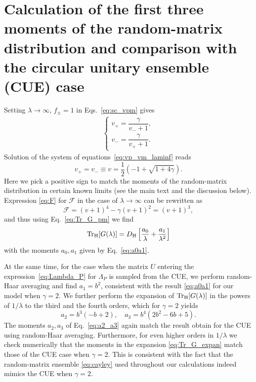 \documentclass[%
 reprint,
 superscriptaddress,
 amsmath,amssymb,
prx,
]{revtex4-2}\href{\href{}{}}{}
\begin{document}
\section{\label{sec:App_Eq_61} Calculation of the first three moments of the random-matrix distribution and comparison with the circular unitary ensemble (CUE) case}


Setting $\lambda\to\infty$, $f_{\pm}=1$ in Eqs.~\eqref{eq:sc_vpm} gives
\begin{align}
	\begin{cases}
		v_+=\dfrac{\gamma}{v_-+1}, \\
		v_-=\dfrac{\gamma}{v_++1}.
	\end{cases}
 \label{eq:vp_vm_laminf}
\end{align}
Solution of the system of equations~\eqref{eq:vp_vm_laminf} reads
\begin{equation}
	v_+=v_-\equiv v=\frac{1}{2}\left(-1+\sqrt{1+4\gamma}\right).
	\label{eq:v_pm_sol_lam0}
\end{equation}
Here we pick a positive sign to match the moments of the random-matrix distribution in certain known limits (see the main text and the discussion below).
Expression \eqref{eq:F} for $\mathcal F$ in the case of $\lambda\to\infty$ can be rewritten as
\begin{equation}
	\mathcal F=(v+1)^4-\gamma(v+1)^2=(v+1)^3,
\end{equation}
and thus using Eq.~\eqref{eq:Tr_G_pm} we find
\begin{equation}
	\Tr_{\rm H}[G(\lambda)]= D_{\rm H}\left[\frac{a_0}{\lambda}+\frac{a_1}{\lambda^2} \right]
\end{equation}
with the moments $a_0,a_1$ given by Eq.~\eqref{eq:a0a1}.

At the same time, for the case when the matrix $U$ entering the expression~\eqref{eq:Lambda_P} for $\Lambda_P$ is sampled from the CUE, we perform random-Haar averaging and find $a_1=b^2$, consistent with the result \eqref{eq:a0a1} for our model when $\gamma=2$.
We further perform the expansion of $\Tr_{\rm H}[G(\lambda)]$ in the powers of $1/\lambda$ to the third and the fourth orders, which for $\gamma=2$ yields
\begin{equation}
    a_2 = b^3(-b+2),\quad a_3 = b^4(2b^2-6b+5).
    \label{eq:a2_a3}
\end{equation}
The moments $a_2,a_3$ of Eq.~\eqref{eq:a2_a3} again match the result obtain for the CUE using random-Haar averaging. 
Furthermore, for even higher orders in $1/\lambda$ we check numerically that the moments in the expansion \eqref{eq:Tr_G_expan} match those of the CUE case when $\gamma=2$.
This is consistent with the fact that the random-matrix ensemble \eqref{eq:cayley} used throughout our calculations indeed mimics the CUE when $\gamma=2$.
\end{document}
